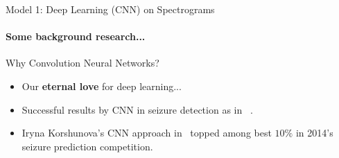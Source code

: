 \documentclass{beamer}
\begin{document}
\begin{frame}{Model 1: Deep Learning (CNN) on Spectrograms}
  \framesubtitle{Some background research...}

  \begin{block}{Why Convolution Neural Networks?}
    \begin{itemize}
    \item Our \textbf{eternal love} for deep learning...
    \item Successful results by CNN in seizure detection as in
      ~\cite{korshunova_faculty_2015,mirowski2008comparing}.
    \item Iryna Korshunova's CNN approach in~\cite{korshunova_faculty_2015}
      topped among best $10\%$ in 2014's seizure prediction competition.
    \end{itemize}
  \end{block}

\end{frame}


  




\end{document}
